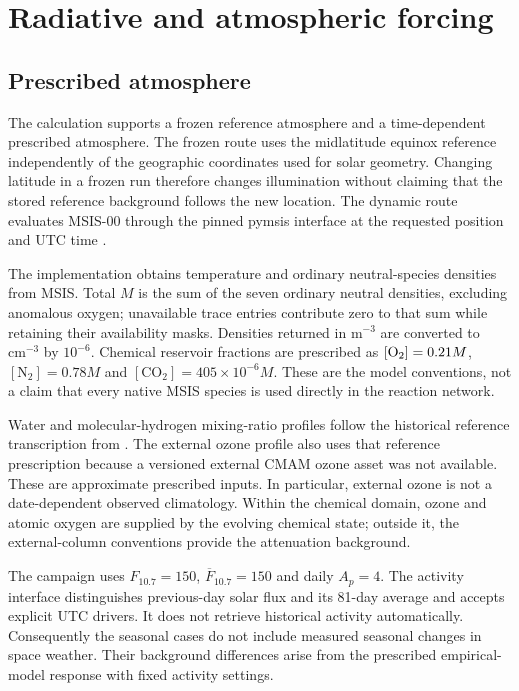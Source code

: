 \chapter{Radiative and atmospheric forcing}\label{ch:forcing}
\section{Prescribed atmosphere}
The calculation supports a frozen reference atmosphere and a time-dependent prescribed atmosphere. The frozen route uses the midlatitude equinox reference independently of the geographic coordinates used for solar geometry. Changing latitude in a frozen run therefore changes illumination without claiming that the stored reference background follows the new location. The dynamic route evaluates MSIS-00 through the pinned pymsis interface at the requested position and UTC time \citep{picone2002}.

The implementation obtains temperature and ordinary neutral-species densities from MSIS. Total $M$ is the sum of the seven ordinary neutral densities, excluding anomalous oxygen; unavailable trace entries contribute zero to that sum while retaining their availability masks. Densities returned in $\mathrm{m^{-3}}$ are converted to $\mathrm{cm^{-3}}$ by $10^{-6}$. Chemical reservoir fractions are prescribed as $[\mathrm{O}_2]=0.21M$, $[\mathrm{N_2}]=0.78M$ and $[\mathrm{CO_2}]=405\times10^{-6}M$. These are the model conventions, not a claim that every native MSIS species is used directly in the reaction network.

Water and molecular-hydrogen mixing-ratio profiles follow the historical reference transcription from \citet{brasseur2005}. The external ozone profile also uses that reference prescription because a versioned external CMAM ozone asset was not available. These are approximate prescribed inputs. In particular, external ozone is not a date-dependent observed climatology. Within the chemical domain, ozone and atomic oxygen are supplied by the evolving chemical state; outside it, the external-column conventions provide the attenuation background.

The campaign uses $F_{10.7}=150$, $\overline F_{10.7}=150$ and daily $A_p=4$. The activity interface distinguishes previous-day solar flux and its 81-day average and accepts explicit UTC drivers. It does not retrieve historical activity automatically. Consequently the seasonal cases do not include measured seasonal changes in space weather. Their background differences arise from the prescribed empirical-model response with fixed activity settings.

